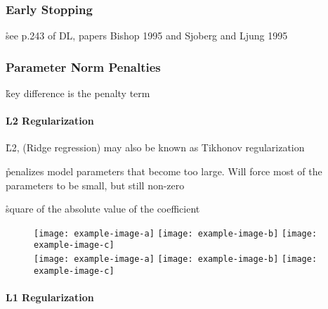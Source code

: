 \subsubsection{Early Stopping}

\r{see p.243 of DL, papers Bishop 1995 and Sjoberg and Ljung 1995}


\subsubsection{Parameter Norm Penalties}

\r{key difference is the penalty term}


\paragraph{L2 Regularization}


\r{L2, ({Ridge regression}) may also be known as {Tikhonov regularization}}

\r{penalizes model parameters that become too large. Will force most of the parameters to be small, but still non-zero}

\r{square of the absolute value of the coefficient}

\begin{figure}[htp]
	\centering
	\texttt{[image: example-image-a]}\hfil
	\texttt{[image: example-image-b]}\hfil
	\texttt{[image: example-image-c]}\hfil\\
	\medskip
	\texttt{[image: example-image-a]}\hfil
	\texttt{[image: example-image-b]}\hfil
	\texttt{[image: example-image-c]}\hfil
	\caption{}
	\label{fig:basics_regularization_l2_example}
\end{figure}



\paragraph{L1 Regularization}

